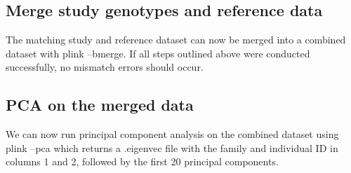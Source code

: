 \documentclass[]{article}
\newenvironment{Shaded}{}{}
\newcommand{\FunctionTok}[1]{\textcolor[rgb]{0.02,0.16,0.49}{#1}}
\newcommand{\VariableTok}[1]{\textcolor[rgb]{0.10,0.09,0.49}{#1}}
\newcommand{\ExtensionTok}[1]{#1}
\newcommand{\NormalTok}[1]{#1}
\begin{document}
\subsection{Merge study genotypes and reference
data}\label{merge-study-genotypes-and-reference-data}

The matching study and reference dataset can now be merged into a
combined dataset with plink --bmerge. If all steps outlined above were
conducted successfully, no mismatch errors should occur.

\begin{Shaded}
\end{Shaded}

\subsection{PCA on the merged data}\label{pca-on-the-merged-data}

We can now run principal component analysis on the combined dataset
using plink --pca which returns a .eigenvec file with the family and
individual ID in columns 1 and 2, followed by the first 20 principal
components.

\begin{Shaded}
\end{Shaded}
\end{document}

